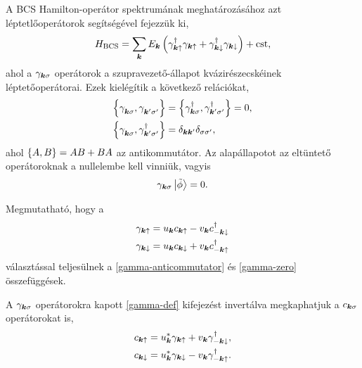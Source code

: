 \documentclass[a4paper,12pt,titlepage]{article}
\newcommand{\KK}{{\vb*{k}}}
\newcommand{\phantomdagger}{{\phantom{\dagger}}}
\begin{document}
A BCS Hamilton-operátor spektrumának meghatározásához azt léptetlőoperátorok segítségével fejezzük ki,
\begin{equation} \label{H-BCS}
	H_\text{BCS} = \sum\limits_\KK E_\KK \left( \gamma_{\KK \uparrow}^\dagger \gamma_{\KK \uparrow} + \gamma_{\KK \downarrow}^\dagger \gamma_{\KK \downarrow} \right) + \text{cst},
\end{equation}
ahol a $\gamma_{\KK \sigma}$ operátorok a szupravezető-állapot kvázirészecskéinek léptetőoperátorai.  Ezek kielégítik a következő relációkat,
\begin{equation} \label{gamma-anticommutator}
\begin{split}
	\anticommutator{\gamma_{\KK \sigma}^\phantomdagger}{\gamma_{\KK^\prime \sigma^\prime}^\phantomdagger} & = \anticommutator{\gamma_{\KK \sigma}^\dagger}{\gamma_{\KK^\prime \sigma^\prime}^\dagger} = 0, \\
	\anticommutator{\gamma_{\KK \sigma}^\phantomdagger}{\gamma_{\KK^\prime \sigma^\prime}^\dagger} & = \delta_{\KK \KK^\prime} \delta_{\sigma \sigma^\prime},
\end{split}
\end{equation}
ahol $\anticommutator{A}{B} = AB + BA$ az antikommutátor.  Az alapállapotot az eltüntető operátoroknak a nullelembe kell vinniük, vagyis
\begin{equation} \label{gamma-zero}
	\gamma_{\KK \sigma} \ket{\tilde{\phi}} = 0.
\end{equation}

Megmutatható, hogy a
\begin{equation} \label{gamma-def}
\begin{split}
	\gamma_{\KK \uparrow} & = u_\KK c_{\KK \uparrow} - v_\KK c_{-\KK \downarrow}^\dagger \\
	\gamma_{\KK \downarrow} & = u_\KK c_{\KK \downarrow} + v_\KK c_{-\KK \uparrow}^\dagger
\end{split}
\end{equation}
választással teljesülnek a \eqref{gamma-anticommutator} és \eqref{gamma-zero} összefüggések.

A $\gamma_{\KK \sigma}$ operátorokra kapott \eqref{gamma-def} kifejezést invertálva megkaphatjuk a $c_{\KK \sigma}$ operátorokat is,
\begin{equation}
\begin{split}
	c_{\KK \uparrow} & = u_\KK^* \gamma_{\KK \uparrow} + v_\KK \gamma_{-\KK \downarrow}^\dagger, \\
	c_{\KK \downarrow} & = u_\KK^* \gamma_{\KK \downarrow} - v_\KK \gamma_{-\KK \uparrow}^\dagger.
\end{split}
\end{equation}
\end{document}
